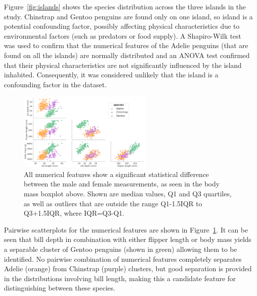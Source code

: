 \documentclass[12pt]{article}
\begin{document}
Figure~\ref{fig:islands} shows the species distribution across the three islands in the study. 
Chinstrap and Gentoo penguins are found only on one island, so island is a potential confounding factor, 
possibly affecting physical characteristics due to environmental factors (such as predators or food supply). 
A Shapiro-Wilk test was used to confirm that the numerical features of the Adelie penguins (that are found on 
all the islands) are normally distributed and an ANOVA test confirmed that their physical characteristics are not significantly influenced by the island inhabited. 
Consequently, it was considered unlikely that the island is a confounding factor in the dataset.

\begin{figure} %
  \centering
  \vspace{-0.3\baselineskip} %
  \includegraphics[width=0.58\textwidth]{pairwise.png} %
  \vspace{-0.5\baselineskip} %
  \caption{All numerical features show a significant statistical difference between the male and female measurements, as seen in the body mass boxplot above. Shown are median values, Q1 and Q3 quartiles, as well as outliers that are outside the range Q1-1.5IQR to Q3+1.5IQR, where IQR=Q3-Q1.}
  \vspace{-0.5\baselineskip} %
  \label{fig:pairwise}
\end{figure}

Pairwise scatterplots for the numerical features are shown in Figure~\ref{fig:pairwise}. 
It can be seen that bill depth in combination with either flipper length or body mass 
yields a separable cluster of Gentoo penguins (shown in green) allowing them to be identified. 
No pairwise combination of numerical features completely separates Adelie (orange) from Chinstrap (purple) clusters, 
but good separation is provided in the distributions involving bill length, 
making this a candidate feature for distinguishing between these species.  
\end{document}
